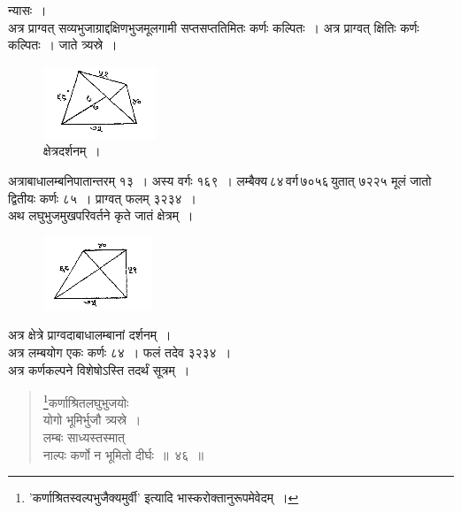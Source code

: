 \documentclass[11pt, openany]{book}
\begin{document}
 न्यासः~। \\

\vspace{-4mm}
 अत्र प्राग्वत् सव्यभुजाग्राद्दक्षिणभुजमूलगामी सप्तसप्ततिमितः कर्णः कल्पितः~। अत्र प्राग्वत् क्षितिः कर्णः कल्पितः~।
जाते त्र्यस्रे~। 
\newpage

\begin{figure}[h!]
    \centering
   \captionsetup{labelformat=empty}
    \caption{क्षेत्रदर्शनम्~।}
\vspace{-2mm}

    \includegraphics[scale=0.8]{graphics/capture53.png}
\end{figure}
\vspace{-2mm}

अत्राबाधालम्बनिपातान्तरम् १३~। अस्य वर्गः १६९~। लम्बैक्य\textendash \,८४\textendash \,वर्ग\textendash \,७०५६\textendash \,युतात् ७२२५ मूलं जातो द्वितीयः कर्णः ८५~। प्राग्वत् फलम् ३२३४~। \\

\vspace{-4mm}
 अथ लघुभुजमुखपरिवर्तने कृते जातं क्षेत्रम्~। 
\vspace{-2mm}
 
\begin{figure}[h!]
    \centering
    \includegraphics[scale=0.8]{graphics/capture54.png}
\end{figure}
\vspace{-2mm}

 अत्र क्षेत्रे प्राग्वदाबाधालम्बानां दर्शनम्~। \\
\indent अत्र लम्बयोग एकः कर्णः ८४~। फलं तदेव ३२३४~। \\
\indent अत्र कर्णकल्पने विशेषोऽस्ति तदर्थं सूत्रम्~। 

\setcounter{footnote}{0}
 \begin{quote}
     \bs 
     \footnote{'{\color{violet}कर्णाश्रितस्वल्पभुजैक्यमुर्वी}' इत्यादि {\color{violet}भास्करो}क्तानुरूपमेवेदम्~।}कर्णाश्रितलघुभुजयोः\\
     योगो भूमिर्भुजौ त्र्यस्रे~।\\
लम्बः साध्यस्तस्मात् \\
नाल्पः कर्णो न भूमितो दीर्घः~॥~४६~॥ 
 \end{quote}
\end{document}
